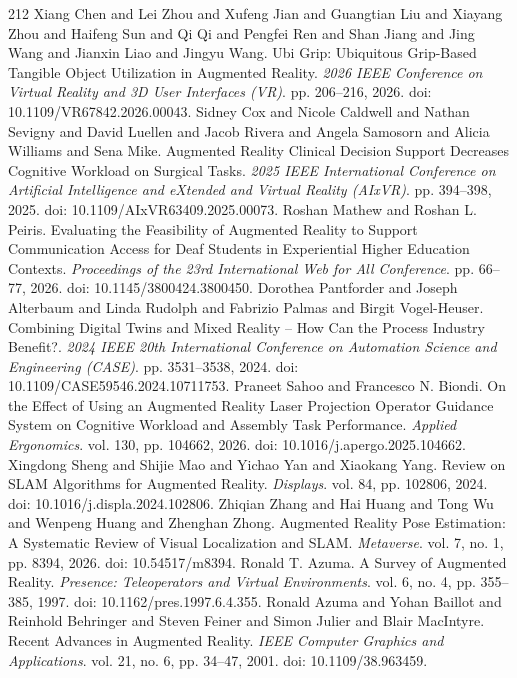 \begin{thebibliography}{212}
 Xiang Chen and Lei Zhou and Xufeng Jian and Guangtian Liu and Xiayang Zhou and Haifeng Sun and Qi Qi and Pengfei Ren and Shan Jiang and Jing Wang and Jianxin Liao and Jingyu Wang. Ubi Grip: Ubiquitous Grip-Based Tangible Object Utilization in Augmented Reality. \emph{2026 IEEE Conference on Virtual Reality and 3D User Interfaces (VR)}. pp. 206--216, 2026. doi: 10.1109/VR67842.2026.00043.
 Sidney Cox and Nicole Caldwell and Nathan Sevigny and David Luellen and Jacob Rivera and Angela Samosorn and Alicia Williams and Sena Mike. Augmented Reality Clinical Decision Support Decreases Cognitive Workload on Surgical Tasks. \emph{2025 IEEE International Conference on Artificial Intelligence and eXtended and Virtual Reality (AIxVR)}. pp. 394--398, 2025. doi: 10.1109/AIxVR63409.2025.00073.
 Roshan Mathew and Roshan L. Peiris. Evaluating the Feasibility of Augmented Reality to Support Communication Access for Deaf Students in Experiential Higher Education Contexts. \emph{Proceedings of the 23rd International Web for All Conference}. pp. 66--77, 2026. doi: 10.1145/3800424.3800450.
 Dorothea Pantforder and Joseph Alterbaum and Linda Rudolph and Fabrizio Palmas and Birgit Vogel-Heuser. Combining Digital Twins and Mixed Reality -- How Can the Process Industry Benefit?. \emph{2024 IEEE 20th International Conference on Automation Science and Engineering (CASE)}. pp. 3531--3538, 2024. doi: 10.1109/CASE59546.2024.10711753.
 Praneet Sahoo and Francesco N. Biondi. On the Effect of Using an Augmented Reality Laser Projection Operator Guidance System on Cognitive Workload and Assembly Task Performance. \emph{Applied Ergonomics}. vol. 130, pp. 104662, 2026. doi: 10.1016/j.apergo.2025.104662.
 Xingdong Sheng and Shijie Mao and Yichao Yan and Xiaokang Yang. Review on SLAM Algorithms for Augmented Reality. \emph{Displays}. vol. 84, pp. 102806, 2024. doi: 10.1016/j.displa.2024.102806.
 Zhiqian Zhang and Hai Huang and Tong Wu and Wenpeng Huang and Zhenghan Zhong. Augmented Reality Pose Estimation: A Systematic Review of Visual Localization and SLAM. \emph{Metaverse}. vol. 7, no. 1, pp. 8394, 2026. doi: 10.54517/m8394.
 Ronald T. Azuma. A Survey of Augmented Reality. \emph{Presence: Teleoperators and Virtual Environments}. vol. 6, no. 4, pp. 355--385, 1997. doi: 10.1162/pres.1997.6.4.355.
 Ronald Azuma and Yohan Baillot and Reinhold Behringer and Steven Feiner and Simon Julier and Blair MacIntyre. Recent Advances in Augmented Reality. \emph{IEEE Computer Graphics and Applications}. vol. 21, no. 6, pp. 34--47, 2001. doi: 10.1109/38.963459.

\end{thebibliography}
